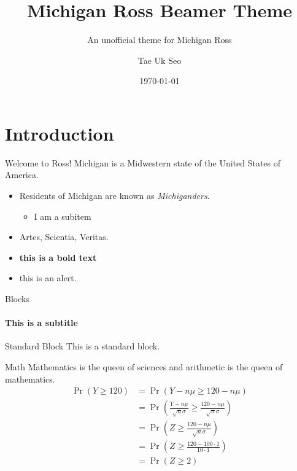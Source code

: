 \documentclass[aspectratio=169]{beamer}
\author{Tae Uk Seo}
\title{Michigan Ross Beamer Theme}
\subtitle{An unofficial theme for Michigan Ross}
\institute{Stephen M. Ross School of Business, University of Michigan}
\date{\today}
\begin{document}
	\begin{frame}[plain]
		\titlepage
	\end{frame}

\section{Introduction}
	
	\begin{frame}{Welcome to Ross!}
	Michigan is a Midwestern state of the United States of America. 
		\begin{itemize}
			\item Residents of Michigan are known as \emph{Michiganders}.
				\begin{itemize}
					\item I am a subitem
				\end{itemize}
			\item Artes, Scientia, Veritas.
			\item \textbf{this is a bold text}
			\item \alert{this is an alert}.
		\end{itemize}
	\end{frame}

	\begin{frame}{Blocks}
		\framesubtitle{This is a subtitle}
		\begin{block}{Standard Block}
			This is a standard block.
		\end{block}
	
	\end{frame}
	
	\begin{frame}{Math}
		Mathematics is the queen of sciences and arithmetic is the queen of mathematics.
		\begin{align*}
			\Pr(Y \geq 120) &= \Pr\left(Y-n\mu \geq 120-n\mu \right)\\
			&= \Pr\left( \frac{Y-n\mu }{\sqrt{n}\sigma} \geq \frac{120-n\mu }{\sqrt{n}\sigma} \right)\\
			&=\Pr\left( Z \geq \frac{120-n\mu }{\sqrt{n}\sigma} \right)\\
			&=\Pr\left( Z \geq \frac{120-100 \cdot 1 }{10 \cdot 1} \right)\\
			&=\Pr\left( Z \geq 2\right)
		\end{align*}
	\end{frame}
\end{document}
